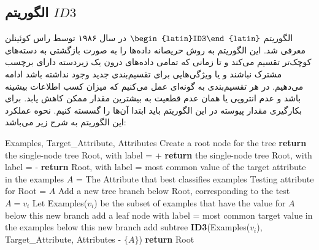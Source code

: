 \subsection{الگوریتم $ID3$}
الگوریتم $\text{\begin{latin}ID3\end{latin}}$ در سال ۱۹۸۶ توسط راس کوئینلن معرفی شد. این الگوریتم به روش حریصانه داده‌ها را به صورت بازگشتی به دسته‌های کوچک‌تر تقسیم می‌کند و تا زمانی که تمامی‌ داده‌های درون یک زیردسته دارای برچسب مشترک نباشند و یا ویژگی‌هایی برای تقسیم‌بندی جدید وجود نداشته باشد ادامه می‌دهیم. در هر تقسیم‌بندی به گونه‌ای عمل می‌کنیم که میزان کسب اطلاعات بیشینه باشد و عدم انتروپی یا همان عدم قطعیت به بیشترین مقدار ممکن کاهش یابد. برای بکارگیری مقدار پیوسته در این الگوریتم باید ابتدا آن‌ها را گسسته کنیم. نحوه عملکرد این الگوریتم به شرح زیر می‌باشد:
\begin{algorithm}[!h]
\caption{$\text{\begin{latin}ID3\end{latin}}$}
\label{id3}
\begin{latin}
\begin{algorithmic}[1]
\REQUIRE Examples, Target\_Attribute, Attributes
\STATE Create a root node for the tree
    \STATE \textbf{return} the single-node tree Root, with label = + 
\ENDIF
{}
    \STATE \textbf{return} the single-node tree Root, with label = - 
\ENDIF
{}
    \STATE \textbf{return} Root, with label = most common value of the target attribute in the examples
\ELSE
    \STATE $A$ = The Attribute that best classifies examples 
    \STATE Testing attribute for Root = $A$
        \STATE Add a new tree branch below Root, corresponding to the test $A=v_i$
        \STATE Let Examples($v_i$) be the subset of examples that have the value for $A$
            \STATE below this new branch add a leaf node with label = most common target value in the examples
        \ELSE
            \STATE below this new branch add subtree \textbf{ID3}(Examples($v_i$), Target\_Attribute, Attributes - $\{A\}$)
        \ENDIF
    \ENDFOR
\ENDIF
\STATE \textbf{return} Root
\end{algorithmic}
\end{latin}
\end{algorithm}

